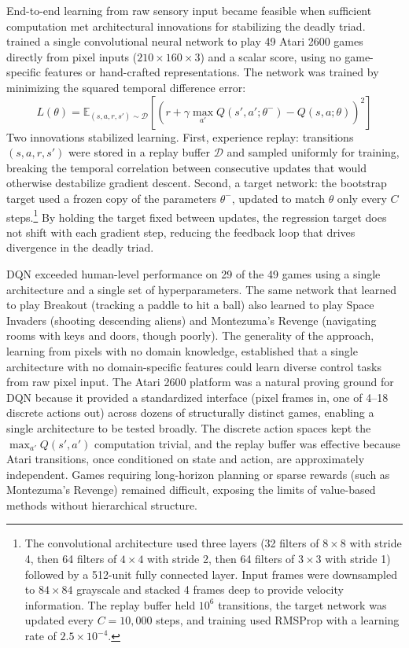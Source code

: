 End-to-end learning from raw sensory input became feasible when sufficient computation met architectural innovations for stabilizing the deadly triad. \citet{mnih2015} trained a single convolutional neural network to play 49 Atari 2600 games directly from pixel inputs ($210 \times 160 \times 3$) and a scalar score, using no game-specific features or hand-crafted representations. The network was trained by minimizing the squared temporal difference error:
\begin{equation}
L(\theta) = \mathbb{E}_{(s,a,r,s') \sim \mathcal{D}} \left[ \left( r + \gamma \max_{a'} Q(s', a'; \theta^-) - Q(s, a; \theta) \right)^2 \right]
\end{equation}
Two innovations stabilized learning. First, experience replay: transitions $(s, a, r, s')$ were stored in a replay buffer $\mathcal{D}$ and sampled uniformly for training, breaking the temporal correlation between consecutive updates that would otherwise destabilize gradient descent. Second, a target network: the bootstrap target used a frozen copy of the parameters $\theta^-$, updated to match $\theta$ only every $C$ steps.\footnote{The convolutional architecture used three layers (32 filters of $8 \times 8$ with stride 4, then 64 filters of $4 \times 4$ with stride 2, then 64 filters of $3 \times 3$ with stride 1) followed by a 512-unit fully connected layer. Input frames were downsampled to $84 \times 84$ grayscale and stacked 4 frames deep to provide velocity information. The replay buffer held $10^6$ transitions, the target network was updated every $C = 10{,}000$ steps, and training used RMSProp with a learning rate of $2.5 \times 10^{-4}$.} By holding the target fixed between updates, the regression target does not shift with each gradient step, reducing the feedback loop that drives divergence in the deadly triad.

DQN exceeded human-level performance on 29 of the 49 games using a single architecture and a single set of hyperparameters. The same network that learned to play Breakout (tracking a paddle to hit a ball) also learned to play Space Invaders (shooting descending aliens) and Montezuma's Revenge (navigating rooms with keys and doors, though poorly). The generality of the approach, learning from pixels with no domain knowledge, established that a single architecture with no domain-specific features could learn diverse control tasks from raw pixel input. The Atari 2600 platform was a natural proving ground for DQN because it provided a standardized interface (pixel frames in, one of 4--18 discrete actions out) across dozens of structurally distinct games, enabling a single architecture to be tested broadly. The discrete action spaces kept the $\max_{a'} Q(s',a')$ computation trivial, and the replay buffer was effective because Atari transitions, once conditioned on state and action, are approximately independent. Games requiring long-horizon planning or sparse rewards (such as Montezuma's Revenge) remained difficult, exposing the limits of value-based methods without hierarchical structure.


